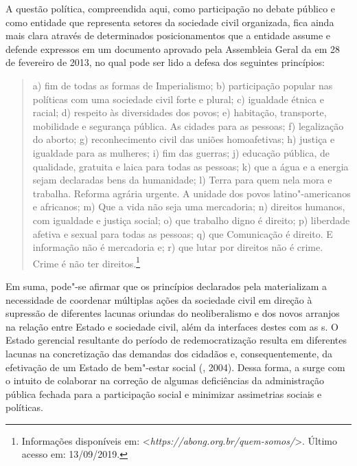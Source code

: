 A questão política, compreendida aqui, como participação no debate
público e como entidade que representa setores da sociedade civil
organizada, fica ainda mais clara através de determinados
posicionamentos que a entidade assume e defende expressos em um
documento aprovado pela Assembleia Geral da  em 28 de fevereiro de
2013, no qual pode ser lido a defesa dos seguintes princípios:

\begin{quote}
a) fim de todas as formas de Imperialismo; b) participação popular nas
políticas com uma sociedade civil forte e plural; c) igualdade étnica e
racial; d) respeito às diversidades dos povos; e) habitação, transporte,
mobilidade e segurança pública. As cidades para as pessoas; f)
legalização do aborto; g) reconhecimento civil das uniões homoafetivas;
h) justiça e igualdade para as mulheres; i) fim das guerras; j) educação
pública, de qualidade, gratuita e laica para todas as pessoas; k) que a
água e a energia sejam declaradas bens da humanidade; l) Terra para quem
nela mora e trabalha. Reforma agrária urgente. A unidade dos povos
latino"-americanos e africanos; m) Que a vida não seja uma mercadoria; n)
direitos humanos, com igualdade e justiça social; o) que trabalho digno
é direito; p) liberdade afetiva e sexual para todas as pessoas; q) que
Comunicação é direito. E informação não é mercadoria e; r) que lutar por
direitos não é crime. Crime é não ter direitos.\footnote{Informações
  disponíveis em:
  \textless{}\emph{https://abong.org.br/quem-somos/}\textgreater{}.
  Último acesso em: 13/09/2019.}
\end{quote}

Em suma, pode"-se afirmar que os princípios declarados pela 
materializam a necessidade de coordenar múltiplas ações da sociedade
civil em direção à supressão de diferentes lacunas oriundas do
neoliberalismo e dos novos arranjos na relação entre Estado e sociedade
civil, além da interfaces destes com as s. O Estado gerencial
resultante do período de redemocratização resulta em diferentes lacunas
na concretização das demandas dos cidadãos e, consequentemente, da
efetivação de um Estado de bem"-estar social (, 2004). Dessa
forma, a  surge com o intuito de colaborar na correção de algumas
deficiências da administração pública fechada para a participação social
e minimizar assimetrias sociais e políticas.

